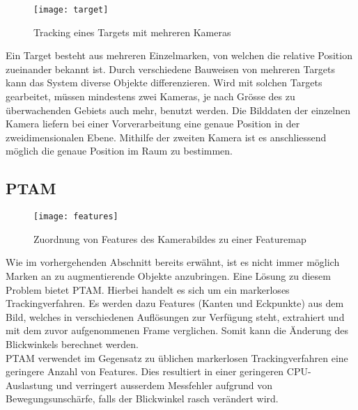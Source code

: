 \begin{wrapfigure}{l}{0.35\textwidth}
	\vspace{-20pt}
	\begin{center}
		\texttt{[image: target]}
	\end{center}
	\vspace{-15pt}
	\captionsetup{width=0.3\textwidth}
	\caption{Tracking eines Targets mit mehreren Kameras}\label{target}
	\vspace{-12pt}
\end{wrapfigure}
Ein Target besteht aus mehreren Einzelmarken, von welchen die relative Position zueinander bekannt ist. Durch verschiedene Bauweisen von mehreren Targets kann das System diverse Objekte differenzieren. Wird mit solchen Targets gearbeitet, müssen mindestens zwei Kameras, je nach Grösse des zu überwachenden Gebiets auch mehr, benutzt werden. Die Bilddaten der einzelnen Kamera liefern bei einer Vorverarbeitung eine genaue Position in der zweidimensionalen Ebene. Mithilfe der zweiten Kamera ist es anschliessend möglich die genaue Position im Raum zu bestimmen.\cite[S.~106~ff.]{doerner13}
\subsection*{PTAM}
\begin{wrapfigure}{r}{0.35\textwidth}
	\vspace{-30pt}
	\begin{center}
		\texttt{[image: features]}
	\end{center}
	\vspace{-15pt}
	\captionsetup{width=0.28\textwidth}
	\caption{Zuordnung von Features des Kamerabildes zu einer Featuremap}\label{features}
	\vspace{-20pt}
\end{wrapfigure}
Wie im vorhergehenden Abschnitt bereits erwähnt, ist es nicht immer möglich Marken an zu augmentierende Objekte anzubringen. Eine Lösung zu diesem Problem bietet PTAM. Hierbei handelt es sich um ein markerloses Trackingverfahren. Es werden dazu Features (Kanten und Eckpunkte) aus dem Bild, welches in verschiedenen Auflösungen zur Verfügung steht, extrahiert und mit dem zuvor aufgenommenen Frame verglichen. Somit kann die Änderung des Blickwinkels berechnet werden.\cite[S.~106~ff.]{doerner13}\\[6pt]
PTAM verwendet im Gegensatz zu üblichen markerlosen Trackingverfahren eine geringere Anzahl von Features. Dies resultiert in einer geringeren CPU-Auslastung und verringert ausserdem Messfehler aufgrund von Bewegungsunschärfe, falls der Blickwinkel rasch verändert wird.\cite{website:ptam}

